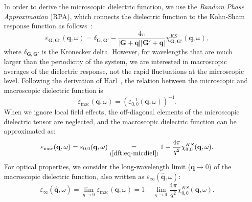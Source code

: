 \begin{refsection}
In order to derive the microscopic dielectric function, we use the 
\textit{Random Phase Approximation} (RPA), which connects the dielectric 
function to the Kohn-Sham response function as follows~\cite{Harl2008}: 
\begin{equation}\label{dft:eq-micdiel} 
\varepsilon_{\mathbf{G},\mathbf{G}'}(\mathbf{q},\omega) = 
\delta_{\mathbf{G},\mathbf{G}'} - \frac{4 \pi}{|\mathbf{G} + \mathbf{q}| 
|\mathbf{G}' + \mathbf{q}|} 
\chi_{\mathbf{G},\mathbf{G}'}^{KS}(\mathbf{q},\omega), 
\end{equation} 
where $\delta_{\mathbf{G},\mathbf{G}'}$ is the Kronecker delta. However, for
wavelengths that are much larger than the periodicity of the system, we are 
interested in macroscopic averages of the dielectric response, not the rapid 
fluctuations at the microscopic level. Following the derivation of 
Harl~\cite{Harl2008}, the relation between the microscopic and macroscopic 
dielectric function is
\begin{equation}
\varepsilon_{\text{mac}}(\mathbf{q}, \omega) = 
(\varepsilon_{0,0}^{-1}(\mathbf{q}, \omega))^{-1}.
\end{equation}
When we ignore local field effects, the off-diagonal elements of the 
microscopic dielectric tensor are neglected, and the macroscopic dielectric 
function can be approximated as: 
\begin{equation} 
\varepsilon_{\text{mac}}(\mathbf{q}, \omega) = \varepsilon_{0,0}(\mathbf{q}, \omega) 
\underset{(\ref{dft:eq-micdiel})}{=} 1 - \frac{4 
\pi}{q^2} \chi_{0,0}^{KS}(\mathbf{q},\omega). 
\end{equation} 
For optical properties, we consider the long-wavelength limit ($\mathbf{q} 
\rightarrow 0$) of the macroscopic dielectric function, also written as 
$\varepsilon_\infty (\mathbf{\hat{q}}, \omega)$:
\begin{equation}
\varepsilon_\infty (\mathbf{\hat{q}}, \omega) = \lim_{q \rightarrow 0} 
\varepsilon_{\text{mac}}(\mathbf{q}, \omega) =  1 - \lim_{q \rightarrow 0} 
\frac{4 \pi}{q^2} \chi_{0,0}^{KS}(\mathbf{q},\omega). 
\end{equation}


\end{refsection}
